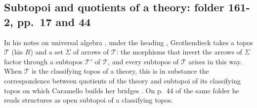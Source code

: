 \subsection{Subtopoi and quotients of a theory: folder 161-2, pp.~17 and 44}

In his notes on universal algebra \cite[p.~17]{grothendieck-161-2}, under the heading , Grothendieck takes a topos $\mathcal T$ (his $R$) and a set $\Sigma$ of arrows of $\mathcal T$: the morphisms that invert the arrows of $\Sigma$ factor through a subtopos $\mathcal T'$ of $\mathcal T$, and every subtopos of $\mathcal T$ arises in this way. When $\mathcal T$ is the classifying topos of a theory, this is in substance the correspondence between quotients of the theory and subtopoi of its classifying topos on which Caramello builds her bridges \cite{caramello-tst}. On p.~44 of the same folder he reads structures as open subtopoi of a classifying topos.
